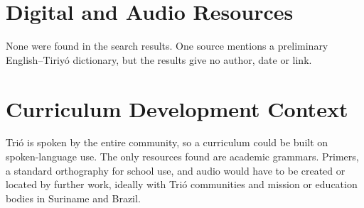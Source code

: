 \documentclass[12pt]{article}
\begin{document}
\section{Digital and Audio Resources}
None were found in the search results. One source mentions a preliminary English--Tiriy\'o dictionary, but the results give no author, date or link.

\section{Curriculum Development Context}
Tri\'o is spoken by the entire community, so a curriculum could be built on spoken-language use. The only resources found are academic grammars. Primers, a standard orthography for school use, and audio would have to be created or located by further work, ideally with Tri\'o communities and mission or education bodies in Suriname and Brazil.
\end{document}
